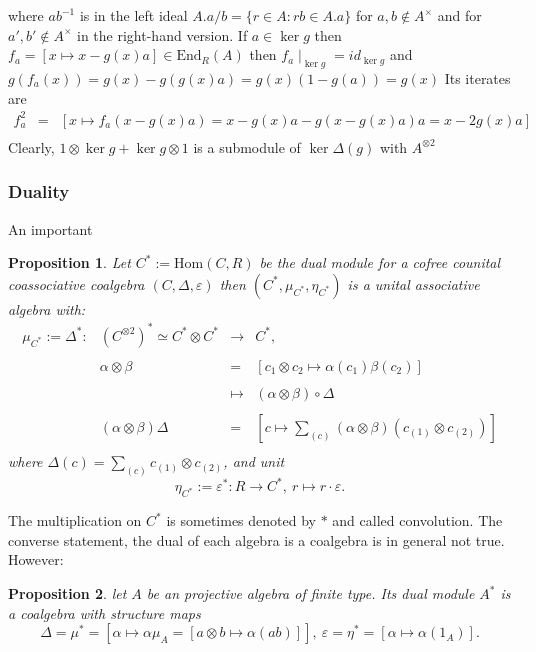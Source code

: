 \documentclass[10pt,a4paper]{article}
\newcommand{\eps}{\varepsilon}
\newcommand{\bao}[1]{\begin{array}{#1}}
\newcommand{\ea}{\end{array}}
\newcommand{\tenso}[2]{#1^{\otimes #2}}
\newcommand{\twotenso}[1]{\tenso{#1}{2}}
\newtheorem{prop}{Proposition}
\begin{document}
where $a b^{-1}$ is in the left ideal $A.a/b = \{r \in A : r b \in A.a\}$ for $a, b \notin A^\times$ and for $a', b' \notin A^\times$ in the right-hand version. If $a \in \ker g$ then $f_a = [x \longmapsto x - g(x) a] \in \mathrm{End}_R(A)$ then $f_a \mid_{\ker g} = id_{\ker g}$ and $g(f_a(x)) = g(x) - g(g(x) a) = g(x)(1 - g(a)) = g(x)$ Its iterates are
$$\bao{rcl}
f_a^2 &=& [x \longmapsto f_a(x - g(x) a) = x - g(x) a - g(x - g(x) a) a = x - 2 g(x) a]\\
\ea$$
Clearly, $1 \otimes \ker g + \ker g \otimes 1$ is a submodule of $\ker \Delta(g)$ with $\twotenso{A}$
\subsubsection{Duality}
An important
\begin{prop}
Let $C^\ast := \mathrm{Hom}(C, R)$ be the dual module for a cofree counital coassociative coalgebra $(C, \Delta, \varepsilon)$ then $(C^\ast, \mu_{C^\ast}, \eta_{C^\ast})$ is a unital associative algebra with:
$$\begin{array}{rrcl}
\mu_{C^\ast} := \Delta^\ast: & \left(C^{\otimes 2}\right)^\ast \simeq C^\ast \otimes C^\ast &\longrightarrow& C^\ast,\\
&&\\
& \alpha \otimes \beta &=& \left[c_1 \otimes c_2 \longmapsto \alpha(c_1)  \beta(c_2)\right] \\
&&\\
& &\longmapsto& (\alpha \otimes \beta) \circ \Delta\\
&&&\\
&(\alpha \otimes \beta) \Delta &=& \left[c \longmapsto \sum_{(c)} (\alpha \otimes \beta)\left(c_{(1)} \otimes c_{(2)}\right)\right]\\
\end{array}$$
where $\Delta(c) = \sum_{(c)} c_{(1)} \otimes c_{(2)}$, and unit
$$\eta_{C^\ast} := \varepsilon^\ast : R \longrightarrow C^\ast,\ r \longmapsto r \cdot \eps.$$
\end{prop}
The multiplication on $C^\ast$ is sometimes denoted by $\ast$ and called convolution. The converse statement, the dual of each algebra is a coalgebra is in general not true. However:
\begin{prop}
let $A$ be an projective algebra of finite type. Its dual module $A^\ast$ is a coalgebra with structure maps
$$\Delta = \mu^\ast = \left[\alpha \longmapsto \alpha \mu_A = \left[a \otimes b \longmapsto \alpha(a b)\right] \right],\ \eps = \eta^\ast = \left[\alpha \longmapsto \alpha(1_A)\right].$$
\end{prop}
\end{document}

